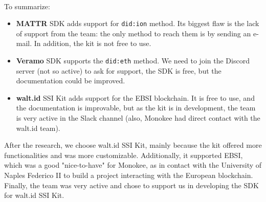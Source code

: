 \vspace{-0.5cm}\\
To summarize:
\begin{itemize}
    \item \textbf{MATTR} SDK adds support for \texttt{did:ion} method. Its biggest flaw is 
    the lack of support from the team: the only method to reach them is by sending an e-mail. 
    In addition, the kit is not free to use.
    \item \textbf{Veramo} SDK supports the \texttt{did:eth} method. We need to join the
    Discord server (not so active) to ask for support, the SDK is free, but the 
    documentation could be improved.
    \item \textbf{walt.id} SSI Kit adds support for the EBSI blockchain. It is free to 
    use, and the documentation is improvable, but as the kit is in development, the 
    team is very active in the Slack channel (also, Monokee had direct contact with the
    walt.id team).
\end{itemize}
After the research, we choose walt.id SSI Kit, mainly because the kit offered more 
functionalities and was more customizable. Additionally, it supported EBSI, which was 
a good "nice-to-have" for Monokee, as in contact with the University of Naples 
Federico II to build a project interacting with the European blockchain.\\
Finally, the team was very active and chose to support us in developing the SDK for 
walt.id SSI Kit.

